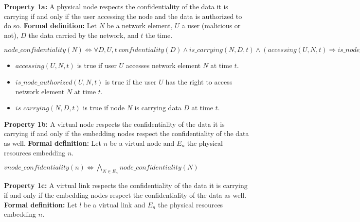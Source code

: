 
\textbf{Property 1a:} A physical node respects the confidentiality of the data it is carrying if and only if the user accessing the node and the data is authorized to do so.
\newline \textbf{Formal definition:} Let $N$ be a network element, $U$ a user (malicious or not), $D$ the data carried by the network, and $t$ the time.


\begin{myformula}
$node\_confidentiality(N) \Leftrightarrow \forall D,U,t~
confidentiality(D) \wedge is\_carrying(N,D,t) \wedge (accessing(U,N,t) \Rightarrow is\_node\_authorized(U,N,t))$
\end{myformula}

\begin{itemize}
\item $accessing(U,N,t)$ is true if user $U$ accesses network element $N$ at time $t$.
\item $is\_node\_authorized(U,N,t)$ is true if the user $U$ has the right to access network element $N$ at time $t$.
\item $is\_carrying(N,D,t)$ is true if node $N$ is carrying data $D$ at time $t$.
\end{itemize}

\textbf{Property 1b:} A virtual node respects the confidentiality of the data it is carrying if and only if the embedding nodes respect the confidentiality of the data as well.
\newline \textbf{Formal definition:} Let $n$ be a virtual node and $E_n$ the physical resources embedding $n$.


\begin{myformula}
$vnode\_confidentiality(n) \Leftrightarrow \bigwedge\limits_{N\in E_n} node\_confidentiality(N) $
\end{myformula}

\textbf{Property 1c:} A virtual link respects the confidentiality of the data it is carrying if and only if the embedding nodes respect the confidentiality of the data as well.
\newline \textbf{Formal definition:} Let $l$ be a virtual link and $E_n$ the physical resources embedding $n$.


